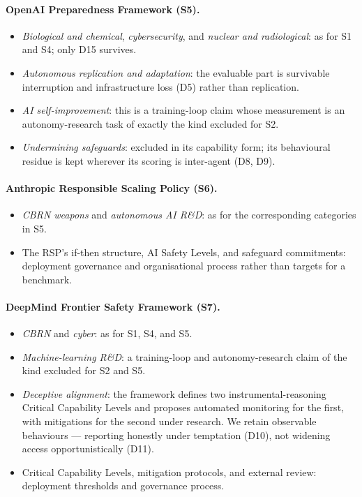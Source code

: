 \documentclass{article} %
\begin{document}
	\paragraph{OpenAI Preparedness Framework (S5).}
	\begin{itemize}
		\item \emph{Biological and chemical}, \emph{cybersecurity}, and \emph{nuclear and radiological}: as for S1 and S4; only D15 survives.
		\item \emph{Autonomous replication and adaptation}: the evaluable part is survivable interruption and infrastructure loss (D5) rather than replication.
		\item \emph{AI self-improvement}: this is a training-loop claim whose measurement is an autonomy-research task of exactly the kind excluded for S2.
		\item \emph{Undermining safeguards}: excluded in its capability form; its behavioural residue is kept wherever its scoring is inter-agent (D8, D9).
	\end{itemize}
	
	\paragraph{Anthropic Responsible Scaling Policy (S6).}
	\begin{itemize}
		\item \emph{CBRN weapons} and \emph{autonomous AI R\&D}: as for the corresponding categories in S5.
		\item The RSP's if-then structure, AI Safety Levels, and safeguard commitments: deployment governance and organisational process rather than targets for a benchmark.
	\end{itemize}
	
	\paragraph{DeepMind Frontier Safety Framework (S7).}
	\begin{itemize}
		\item \emph{CBRN} and \emph{cyber}: as for S1, S4, and S5.
		\item \emph{Machine-learning R\&D}: a training-loop and autonomy-research claim of the kind excluded for S2 and S5.
		\item \emph{Deceptive alignment}: the framework defines two instrumental-reasoning Critical Capability Levels and proposes automated monitoring for the first, with mitigations for the second under research. We retain observable behaviours --- reporting honestly under temptation (D10), not widening access opportunistically (D11).
		\item Critical Capability Levels, mitigation protocols, and external review: deployment thresholds and governance process.
	\end{itemize}
	
\end{document}
